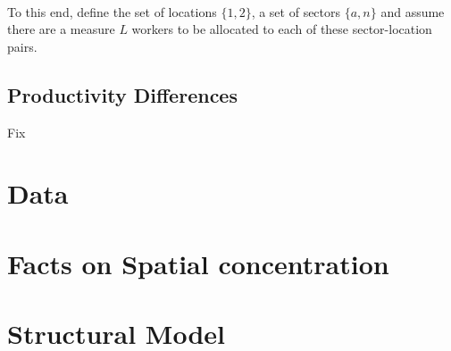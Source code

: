 \documentclass[]{article}
\begin{document}
\paragraph*{}
To this end, define the set of locations $\{1, 2\}$, a set of sectors $\{a, n\}$ and assume there are a measure $L$ workers to be allocated to each of these sector-location pairs.

\subsection*{Productivity Differences} Fix




\newpage
\section{Data}

\section{Facts on Spatial concentration}

\section{Structural Model}


\newpage
\nocite{*}
\scriptsize

\end{document}
